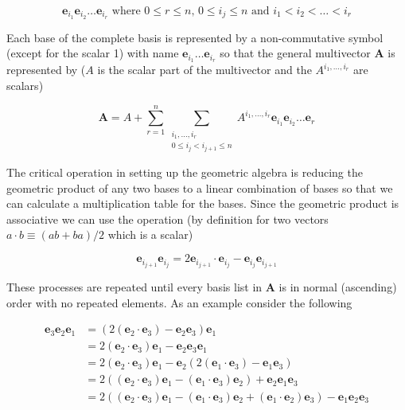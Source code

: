 \documentclass[12pt]{report}
\newcommand{\bm}[1]{\boldsymbol{#1}}
\newcommand{\lp}{\left (}
\newcommand{\rp}{\right )}
\newcommand{\paren}[1]{\lp {#1} \rp}
\newcommand{\eb}{\bm{e}}
\begin{document}
   \begin{equation}
      \eb_{i_{1}}\eb_{i_{2}}\dots \eb_{i_{r}} \mbox{ where } 0\le r \le n\mbox{, }0 \le i_{j} \le n \mbox{ and } i_{1}<i_{2}<\dots<i_{r}
   \end{equation}

Each base of the complete basis is represented by a non-commutative symbol (except for the scalar 1)
with name $\eb_{i_{1}}\dots \eb_{i_{r}}$ so that the general multivector $\bm{A}$ is represented by
($A$ is the scalar part of the multivector and the $A^{i_{1},\dots,i_{r}}$ are scalars)

   \begin{equation}
      \bm{A} = A + \sum_{r=1}^{n}\sum_{\substack{i_{1},\dots,i_{r}\\ 0\le i_{j}<i_{j+1} \le n}}
               A^{i_{1},\dots,i_{r}}\eb_{i_{1}}\eb_{i_{2}}\dots \eb_{r}
   \end{equation}

The critical operation in setting up the geometric algebra is reducing
the geometric product of any two bases to a linear combination of bases so that
we can calculate a multiplication table for the bases.  Since the geometric
product is associative we can use the operation (by definition for two vectors
$a\cdot b \equiv (ab+ba)/2$  which is a scalar)

   \begin{equation}\label{reduce}
      \eb_{i_{j+1}}\eb_{i_{j}} = 2\eb_{i_{j+1}}\cdot \eb_{i_{j}} - \eb_{i_{j}}\eb_{i_{j+1}}
   \end{equation}

These processes are repeated until every basis list in $\bm{A}$ is in normal
(ascending) order with no repeated elements. As an example consider the
following

   \begin{align}
      \eb_{3}\eb_{2}\eb_{1} &= (2(\eb_{2}\cdot \eb_{3}) - \eb_{2}\eb_{3})\eb_{1} \\
                      &= 2\paren{\eb_{2}\cdot \eb_{3}}\eb_{1} - \eb_{2}\eb_{3}\eb_{1} \\
                      &= 2\paren{\eb_{2}\cdot \eb_{3}}\eb_{1} - \eb_{2}\paren{2\paren{\eb_{1}\cdot \eb_{3}}-\eb_{1}\eb_{3}} \\
                      &= 2\paren{\paren{\eb_{2}\cdot \eb_{3}}\eb_{1}-\paren{\eb_{1}\cdot \eb_{3}}\eb_{2}}+\eb_{2}\eb_{1}\eb_{3} \\
                      &= 2\paren{\paren{\eb_{2}\cdot \eb_{3}}\eb_{1}-\paren{\eb_{1}\cdot \eb_{3}}\eb_{2}+
                         \paren{\eb_{1}\cdot \eb_{2}}\eb_{3}}-\eb_{1}\eb_{2}\eb_{3}
   \end{align}
\end{document}
